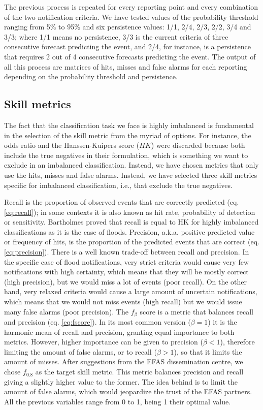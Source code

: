 \documentclass[preprint,12pt]{elsarticle}
\begin{document}
The previous process is repeated for every reporting point and every combination of the two notification criteria. We have tested values of the probability threshold ranging from 5\% to 95\% and six persistence values: 1/1, 2/4, 2/3, 2/2, 3/4 and 3/3; where 1/1 means no persistence, 3/3 is the current criteria of three consecutive forecast predicting the event, and 2/4, for instance, is a persistence that requires 2 out of 4 consecutive forecasts predicting the event. The output of all this process are matrices of hits, misses and false alarms for each reporting depending on the probability threshold and persistence.

\subsection{Skill metrics}
\label{sec:methods_metrics}

The fact that the classification task we face is highly imbalanced is fundamental in the selection of the skill metric from the myriad of options. For instance, the odds ratio and the Hanssen-Kuipers score ($HK$) \cite{Hanssen1965} were discarded because both include the true negatives in their formulation, which is something we want to exclude in an imbalanced classification. Instead, we have chosen metrics that only use the hits, misses and false alarms. Instead, we have selected three skill metrics specific for imbalanced classification, i.e., that exclude the true negatives. 

Recall is the proportion of observed events that are correctly predicted (eq. \ref{eq:recall}); in some contexts it is also known as hit rate, probability of detection or sensitivity. Bartholmes \cite{Bartholmes2009} proved that recall is equal to HK for highly imbalanced classifications as it is the case of floods. Precision, a.k.a. positive predicted value or frequency of hits, is the proportion of the predicted events that are correct (eq. \ref{eq:precision}). There is a well known trade-off between recall  and precision. In the specific case of flood notifications, very strict criteria would cause very few notifications with high certainty, which means that they will be mostly correct (high precision), but we would miss a lot of events (poor recall). On the other hand, very relaxed criteria would cause a large amount of uncertain notifications, which means that we would not miss events (high recall) but we would issue many false alarms (poor precision). The $f_{\beta}$ score  is a metric that balances recall  and precision (eq. \ref{eq:fscore}). In its most common version ($\beta = 1$) it is the harmonic mean of recall and precision, granting equal importance to both metrics. However, higher importance can be given to precision ($\beta < 1$), therefore limiting the amount of false alarms, or to recall ($\beta > 1$), so that it limits the amount of misses. After suggestions from the EFAS dissemination centre, we chose $f_{0.8}$ as the target skill metric. This metric balances precision and recall giving a slightly higher value to the former. The idea behind is to limit the amount of false alarms, which would jeopardize the trust of the EFAS partners. All the previous variables range from 0 to 1, being 1 their optimal value.
\end{document}
